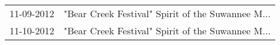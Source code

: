 \begin{supertabular}{ll}
 11-09-2012 &  "Bear Creek Festival" Spirit of the Suwannee M... \\
 11-10-2012 &  "Bear Creek Festival" Spirit of the Suwannee M... \\
\end{supertabular}
